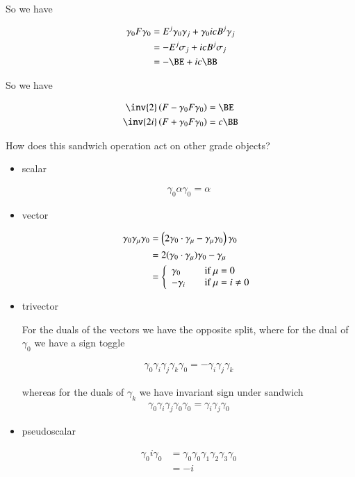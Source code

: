 So we have

\begin{align*}
\gamma_0 F \gamma_0
&= E^j \gamma_0 \gamma_j + \gamma_0 i c B^j \gamma_j \\
&= -E^j \sigma_j + i c B^j \sigma_j \\
&= -\BE + i c \BB
\end{align*}

So we have

\begin{align*}
\inv{2} \left(F - \gamma_0 F \gamma_0 \right) &= \BE \\
\inv{2i} \left(F + \gamma_0 F \gamma_0 \right) &= c \BB
\end{align*}

How does this sandwich operation act on other grade objects?

\begin{itemize}
\item scalar

\begin{align*}
\gamma_0 \alpha \gamma_0 = \alpha
\end{align*}

\item vector

\begin{align*}
\gamma_0 \gamma_\mu \gamma_0 
&= \left(2 \gamma_0 \cdot \gamma_\mu - \gamma_\mu \gamma_0\right) \gamma_0 \\
&= 2 (\gamma_0 \cdot \gamma_\mu) \gamma_0 - \gamma_\mu \\
&= 
\left\{
\begin{array}{l l}
\gamma_0 & \quad \mbox{if $\mu = 0$} \\
-\gamma_i & \quad \mbox{if $\mu = i \ne 0$} \\
\end{array} \right.
\end{align*}

\item trivector

For the duals of the vectors we have the opposite split, where for the dual of $\gamma_0$ we have a sign
toggle

\begin{align*}
\gamma_0 \gamma_i \gamma_j \gamma_k \gamma_0 = -\gamma_i \gamma_j \gamma_k
\end{align*}

whereas for the duals of $\gamma_k$ we have invariant sign under sandwich
\begin{align*}
\gamma_0 \gamma_i \gamma_j \gamma_0 \gamma_0 = \gamma_i \gamma_j \gamma_0
\end{align*}

\item pseudoscalar

\begin{align*}
\gamma_0 i \gamma_0 
&= \gamma_0 \gamma_0 \gamma_1 \gamma_2 \gamma_3 \gamma_0 \\
&= -i 
\end{align*}
\end{itemize}

